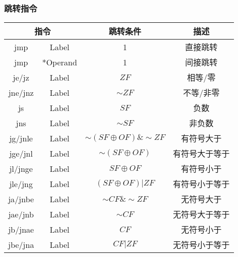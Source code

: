 \subsubsection{跳转指令}
\begin{table}[H]
    \centering
    \begin{tabular}{|c c|c|c|}
        \hline
        \multicolumn{2}{|c|}{\textbf{指令}} & \textbf{跳转条件} & \textbf{描述}                                \\
        \hline
        jmp                               & Label         & 1                                & 直接跳转    \\
        jmp                               & *Operand      & 1                                & 间接跳转    \\
        \hline
        je/jz                             & Label         & $ZF$                             & 相等/零    \\
        jne/jnz                           & Label         & $\sim ZF$                        & 不等/非零   \\
        \hline
        js                                & Label         & $SF$                             & 负数      \\
        jns                               & Label         & $\sim SF$                        & 非负数     \\
        \hline
        jg/jnle                           & Label         & $\sim (SF \oplus OF) \& \sim ZF$ & 有符号大于   \\
        jge/jnl                           & Label         & $\sim (SF \oplus OF)$            & 有符号大于等于 \\
        jl/jnge                           & Label         & $SF \oplus OF$                   & 有符号小于   \\
        jle/jng                           & Label         & $(SF \oplus OF) | ZF$            & 有符号小于等于 \\
        \hline
        ja/jnbe                           & Label         & $\sim CF \& \sim ZF$             & 无符号大于   \\
        jae/jnb                           & Label         & $\sim CF$                        & 无符号大于等于 \\
        jb/jnae                           & Label         & $CF$                             & 无符号小于   \\
        jbe/jna                           & Label         & $CF | ZF$                        & 无符号小于等于 \\
        \hline
    \end{tabular}
\end{table}

